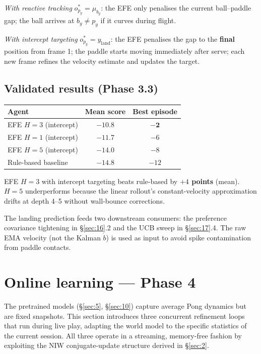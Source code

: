 \documentclass[12pt, a4paper]{article}
\newcommand{\1}{\mathbf{1}}
\begin{document}
\textit{With reactive tracking} $o^*_{p_y} = \mu_{b_y}$:
the EFE only penalises the current ball--paddle gap; the ball arrives at
$b_y \ne p_y$ if it curves during flight.

\textit{With intercept targeting} $o^*_{p_y} = y_\text{land}$:
the EFE penalises the gap to the \textbf{final} position from frame 1; the paddle
starts moving immediately after serve; each new frame refines the velocity
estimate and updates the target.

\subsection{Validated results (Phase 3.3)}

\begin{table}[ht]
\centering
\begin{tabular}{lcc}
\toprule
Agent & Mean score & Best episode \\
\midrule
EFE $H=3$ (intercept) & $\mathbf{-10.8}$ & $\mathbf{-2}$ \\
EFE $H=1$ (intercept) & $-11.7$ & $-6$ \\
EFE $H=5$ (intercept) & $-14.0$ & $-8$ \\
Rule-based baseline   & $-14.8$ & $-12$ \\
\bottomrule
\end{tabular}
\end{table}

EFE $H=3$ with intercept targeting beats rule-based by \textbf{$+4$ points}
(mean).  $H=5$ underperforms because the linear rollout's constant-velocity
approximation drifts at depth 4--5 without wall-bounce corrections.

The landing prediction feeds two downstream consumers: the preference covariance
tightening in \S\ref{sec:16}.2 and the UCB sweep in \S\ref{sec:17}.4.  The raw
EMA velocity (not the Kalman $\dot b$) is used as input to avoid spike
contamination from paddle contacts.

\section{Online learning --- Phase 4}
\label{sec:14}

The pretrained models (\S\ref{sec:5}, \S\ref{sec:10}) capture average Pong
dynamics but are fixed snapshots.  This section introduces three concurrent
refinement loops that run during live play, adapting the world model to the
specific statistics of the current session.  All three operate in a streaming,
memory-free fashion by exploiting the NIW conjugate-update structure derived in
\S\ref{sec:2}.
\end{document}
